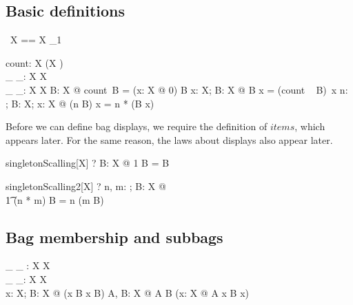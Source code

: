 \documentclass{article}
\begin{document}
\subsection{Basic definitions}

\begin{zed}
  \bag~X == X \pfun \nat_1
\end{zed}

\begin{gendef}[X]
  count: \bag X \bij (X \fun \nat) \\
  \_ \bcount \_: \bag X \cross X \fun \nat \\
  \_ \otimes \_: \nat \cross \bag X \fun \bag X
\where
  \forall B: \bag X @ count~B = (\lambda x: X @ 0) \oplus B
\also
  \forall x: X; B: \bag X @ B \bcount x = (count ~ B)~x
\also
\forall n: \nat; B: \bag X; x: X @  (n \otimes B) \bcount x = n * (B \bcount x)
\end{gendef}

Before we can define bag displays, we require the
definition of $items$, which appears later. For the
same reason, the laws about displays also appear later.

\begin{theorem}{singletonScalling}[X]
    \vdash? \forall B: \bag X @ 1 \otimes B = B
\end{theorem}
\begin{theorem}{singletonScalling2}[X]
    \vdash? \forall n, m: \nat ; B: \bag X @ \\
         \t1 (n * m) \otimes B = n \otimes (m \otimes B)
\end{theorem}

\subsection{Bag membership and subbags}

\begin{gendef}[X]
  \_ \inbag \_ : X \rel \bag X \\
  \_ \subbageq \_: \bag X \rel \bag X \\
\where
  \forall x: X; B: \bag X @ (x \inbag B \iff x \in \dom B)
\also
  \forall A, B: \bag X @ A \subbageq B \iff
	(\forall x: X @ A \bcount x \leq B \bcount x)
\end{gendef}
\end{document}
